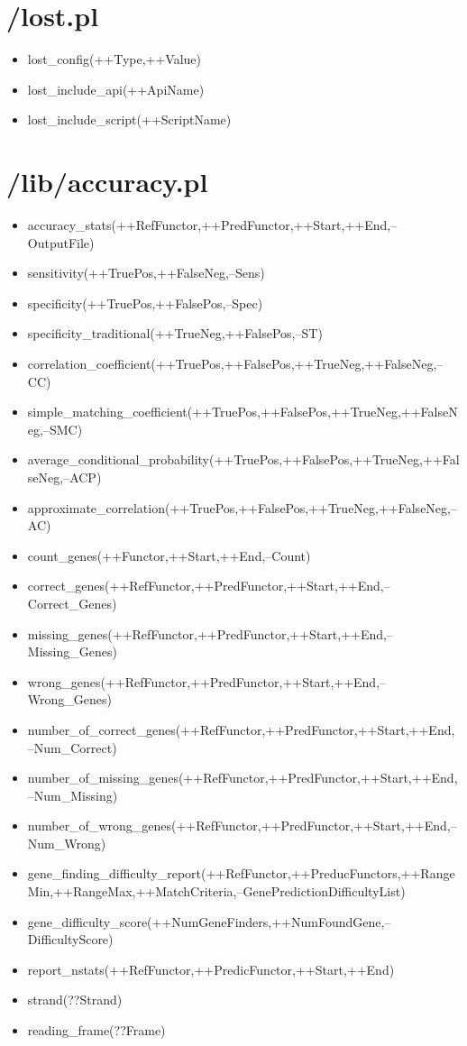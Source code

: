 \section{/lost.pl}
%
\begin{itemize}
\item lost\_config(++Type,++Value)
\item lost\_include\_api(++ApiName)
\item lost\_include\_script(++ScriptName)
\end{itemize}


\section{/lib/accuracy.pl}
%
\begin{itemize}
\item accuracy\_stats(++RefFunctor,++PredFunctor,++Start,++End,--OutputFile)
\item sensitivity(++TruePos,++FalseNeg,--Sens)
\item specificity(++TruePos,++FalsePos,--Spec)
\item specificity\_traditional(++TrueNeg,++FalsePos,--ST)
\item correlation\_coefficient(++TruePos,++FalsePos,++TrueNeg,++FalseNeg,--CC)
\item simple\_matching\_coefficient(++TruePos,++FalsePos,++TrueNeg,++FalseNeg,--SMC)
\item average\_conditional\_probability(++TruePos,++FalsePos,++TrueNeg,++FalseNeg,--ACP)
\item approximate\_correlation(++TruePos,++FalsePos,++TrueNeg,++FalseNeg,--AC)
\item count\_genes(++Functor,++Start,++End,--Count)
\item correct\_genes(++RefFunctor,++PredFunctor,++Start,++End,--Correct\_Genes)
\item missing\_genes(++RefFunctor,++PredFunctor,++Start,++End,--Missing\_Genes)
\item wrong\_genes(++RefFunctor,++PredFunctor,++Start,++End,--Wrong\_Genes)
\item number\_of\_correct\_genes(++RefFunctor,++PredFunctor,++Start,++End,--Num\_Correct)
\item number\_of\_missing\_genes(++RefFunctor,++PredFunctor,++Start,++End,--Num\_Missing)
\item number\_of\_wrong\_genes(++RefFunctor,++PredFunctor,++Start,++End,--Num\_Wrong)
\item gene\_finding\_difficulty\_report(++RefFunctor,++PreducFunctors,++RangeMin,++RangeMax,++MatchCriteria,--GenePredictionDifficultyList)
\item gene\_difficulty\_score(++NumGeneFinders,++NumFoundGene,--DifficultyScore)
\item report\_nstats(++RefFunctor,++PredicFunctor,++Start,++End)
\item strand(??Strand)
\item reading\_frame(??Frame)
\end{itemize}


